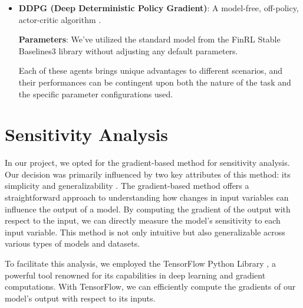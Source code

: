 \documentclass[12pt]{article}
\begin{document}
\begin{itemize}
\item \textbf{DDPG (Deep Deterministic Policy Gradient)}: A model-free, off-policy, actor-critic algorithm \cite{lillicrap2019continuous}.

\textbf{Parameters}: We've utilized the standard model from the FinRL Stable Baselines3 library without adjusting any default parameters.

Each of these agents brings unique advantages to different scenarios, and their performances can be contingent upon both the nature of the task and the specific parameter configurations used.
\end{itemize}

\section{Sensitivity Analysis} %
\label{subsec:sensitvity}
In our project, we opted for the gradient-based method for sensitivity analysis. Our decision was primarily influenced by two key attributes of this method: its simplicity and generalizability \cite{gradients_tutorial}. The gradient-based method offers a straightforward approach to understanding how changes in input variables can influence the output of a model. By computing the gradient of the output with respect to the input, we can directly measure the model's sensitivity to each input variable. This method is not only intuitive but also generalizable across various types of models and datasets.

To facilitate this analysis, we employed the TensorFlow Python Library \cite{tensorflow2015whitepaper}, a powerful tool renowned for its capabilities in deep learning and gradient computations. With TensorFlow, we can efficiently compute the gradients of our model's output with respect to its inputs.
\end{document}
